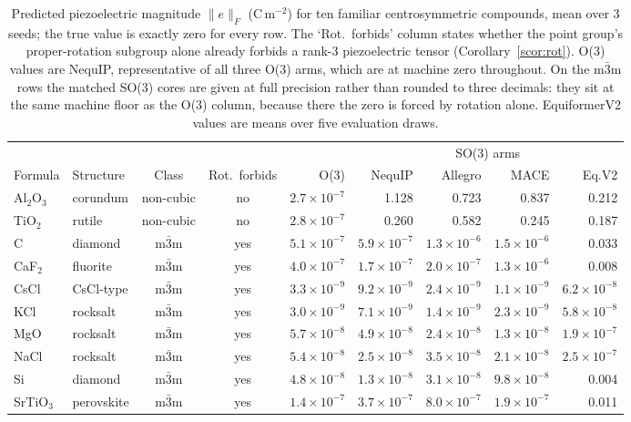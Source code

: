 \begin{table}[htbp]
\centering
\caption{Predicted piezoelectric magnitude $\lVert e \rVert_F$ (C\,m$^{-2}$) for ten familiar centrosymmetric compounds, mean over 3 seeds; the true value is exactly zero for every row. The `Rot.\ forbids' column states whether the point group's proper-rotation subgroup alone already forbids a rank-3 piezoelectric tensor (Corollary~\ref{scor:rot}). O(3) values are NequIP, representative of all three O(3) arms, which are at machine zero throughout. On the m$\bar 3$m rows the matched SO(3) cores are given at full precision rather than rounded to three decimals: they sit at the same machine floor as the O(3) column, because there the zero is forced by rotation alone. EquiformerV2 values are means over five evaluation draws.}
\label{stab:named}
\scriptsize
\begin{tabular}{@{}llccr rrrr@{}}
\toprule
 & & & & & \multicolumn{4}{c}{SO(3) arms} \\
\cmidrule(l){6-9}
Formula & Structure & Class & Rot.\ forbids & O(3) & NequIP & Allegro & MACE & Eq.V2 \\
\midrule
Al$_2$O$_3$ & corundum & non-cubic & no & $2.7\times10^{-7}$ & 1.128 & 0.723 & 0.837 & 0.212 \\
TiO$_2$ & rutile & non-cubic & no & $2.8\times10^{-7}$ & 0.260 & 0.582 & 0.245 & 0.187 \\
C & diamond & m$\bar 3$m & yes & $5.1\times10^{-7}$ & $5.9\times10^{-7}$ & $1.3\times10^{-6}$ & $1.5\times10^{-6}$ & 0.033 \\
CaF$_2$ & fluorite & m$\bar 3$m & yes & $4.0\times10^{-7}$ & $1.7\times10^{-7}$ & $2.0\times10^{-7}$ & $1.3\times10^{-6}$ & 0.008 \\
CsCl & CsCl-type & m$\bar 3$m & yes & $3.3\times10^{-9}$ & $9.2\times10^{-9}$ & $2.4\times10^{-9}$ & $1.1\times10^{-9}$ & $6.2\times10^{-8}$ \\
KCl & rocksalt & m$\bar 3$m & yes & $3.0\times10^{-9}$ & $7.1\times10^{-9}$ & $1.4\times10^{-9}$ & $2.3\times10^{-9}$ & $5.8\times10^{-8}$ \\
MgO & rocksalt & m$\bar 3$m & yes & $5.7\times10^{-8}$ & $4.9\times10^{-8}$ & $2.4\times10^{-8}$ & $1.3\times10^{-8}$ & $1.9\times10^{-7}$ \\
NaCl & rocksalt & m$\bar 3$m & yes & $5.4\times10^{-8}$ & $2.5\times10^{-8}$ & $3.5\times10^{-8}$ & $2.1\times10^{-8}$ & $2.5\times10^{-7}$ \\
Si & diamond & m$\bar 3$m & yes & $4.8\times10^{-8}$ & $1.3\times10^{-8}$ & $3.1\times10^{-8}$ & $9.8\times10^{-8}$ & 0.004 \\
SrTiO$_3$ & perovskite & m$\bar 3$m & yes & $1.4\times10^{-7}$ & $3.7\times10^{-7}$ & $8.0\times10^{-7}$ & $1.9\times10^{-7}$ & 0.011 \\
\bottomrule
\end{tabular}

\end{table}

